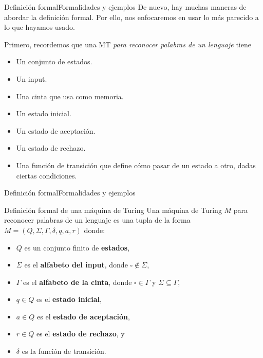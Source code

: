 \documentclass[spanish]{beamer}
\begin{document}
\begin{frame}{Definición formal}{Formalidades y ejemplos}
    De nuevo, hay muchas maneras de abordar la definición formal.
    Por ello, nos enfocaremos en usar lo más parecido a lo que hayamos usado. \pause

    \bigskip

    Primero, recordemos que una MT \textit{para reconocer palabras de un lenguaje} tiene
    \begin{itemize}
        \item Un conjunto de estados. \pause
        \item Un input. \pause
        \item Una cinta que usa como memoria. \pause
        \item Un estado inicial. \pause
        \item Un estado de aceptación. \pause
        \item Un estado de rechazo. \pause
        \item Una función de transición que define cómo pasar de un estado a otro, dadas ciertas condiciones.
    \end{itemize}
\end{frame}

\begin{frame}{Definición formal}{Formalidades y ejemplos}
    \begin{block}{Definición formal de una máquina de Turing}
        Una máquina de Turing $M$ para reconocer palabras de un lenguaje es una tupla de la forma $M = (Q, \Sigma, \Gamma, \delta, q, a, r)$ donde: \pause

        \begin{itemize}
            \item $Q$ es un conjunto finito de \textbf{estados}, \pause
            \item $\Sigma$ es el \textbf{alfabeto del input}, donde $\square \not \in \Sigma$, \pause
            \item $\Gamma$ es el \textbf{alfabeto de la cinta}, donde $\square \in \Gamma$ y $\Sigma \subseteq \Gamma$, \pause
            \item $q \in Q$ es el \textbf{estado inicial}, \pause
            \item $a \in Q$ es el \textbf{estado de aceptación}, \pause
            \item $r \in Q$ es el \textbf{estado de rechazo}, y \pause
            \item $\delta$ es la función de transición.
        \end{itemize}
    \end{block}
\end{frame}
\end{document}
